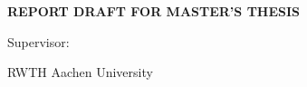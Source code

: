 \begin{titlepage}
    \begin{center}
        \vspace*{0.1cm}

        \LARGE
        \textbf{REPORT DRAFT FOR MASTER'S THESIS}

        \vspace{1cm}
        \large
        \vspace*{0.3cm}
        \large
        \textbf{\docTitle{}}

        \vspace{1cm}
        \LARGE
        \docAuthor{}

        \vspace{1cm}
        \large
        Supervisor: \\
        \vspace{0.3cm}
        \Large
        \docSupervisor{}

        \vspace{0.5cm}
        \large
        \vspace{0.3cm}
        \Large
        \docDate{}

        

        \vfill
        \normalsize
        
        
        \vspace*{0.5cm}
        
        
        \vspace*{0.5cm}
        
        \large
        RWTH Aachen University \\
        
        \vspace*{1cm}
        

        
    \end{center}
\end{titlepage}
